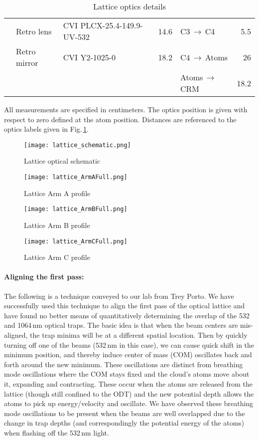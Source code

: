 \begin{table}[]
{{\begin{tabular}{@{}|c|llr|lr|@{}}
 & Retro lens & CVI PLCX-25.4-149.9-UV-532 & 14.6 & C3$\,\rightarrow\,$C4 & 5.5 \\
 & Retro mirror & CVI Y2-1025-0 & 18.2 & C4$\,\rightarrow\,$Atoms & 26 \\
 &  &  &  & Atoms$\,\rightarrow\,$CRM & 18.2 \\ \bottomrule
\end{tabular}%
}}
\caption{Lattice optics details}{All measurements are specified in centimeters. The optics position is given with respect to zero defined at the atom position. Distances are referenced to the optics labels given in Fig.\,\ref{fig:532schematic}.}
\label{tab:532sys}
\end{table}

	\begin{figure} 
		\centerline{
		\texttt{[image: lattice\_schematic.png]}}
		\caption{Lattice optical schematic}
		\label{fig:532schematic}
	\end{figure}
	
	\begin{figure} 
		\centerline{
		\texttt{[image: lattice\_ArmAFull.png]}}
		\caption{Lattice Arm A profile}
		\label{fig:532armAProfile}
	\end{figure}
	
	\begin{figure} 
		\centerline{
		\texttt{[image: lattice\_ArmBFull.png]}}
		\caption{Lattice Arm B profile}
		\label{fig:532armBProfile}
	\end{figure}
	
	\begin{figure} 
		\centerline{
		\texttt{[image: lattice\_ArmCFull.png]}}
		\caption{Lattice Arm C profile}
		\label{fig:532armCProfile}
	\end{figure}

\paragraph{Aligning the first pass:}
The following is a technique conveyed to our lab from Trey Porto.
We have successfully used this technique to align the first pass of the optical lattice and have found no better means of quantitatively determining the overlap of the 532 and 1064\,nm optical traps.
The basic idea is that when the beam centers are mis-aligned, the trap minima will be at a different spatial location.
Then by quickly turning off one of the beams (532\,nm in this case), we can cause quick shift in the minimum position, and thereby induce center of mass (COM) oscillates back and forth around the new minimum.
These oscillations are distinct from breathing mode oscillations where the COM stays fixed and the cloud's atoms move about it, expanding and contracting. 
These occur when the atoms are released from the lattice (though still confined to the ODT) and the new potential depth allows the atoms to pick up energy/velocity and oscillate.
We have observed these breathing mode oscillations to be present when the beams are well overlapped due to the change in trap depths (and correspondingly the potential energy of the atoms) when flashing off the 532\,nm light.

